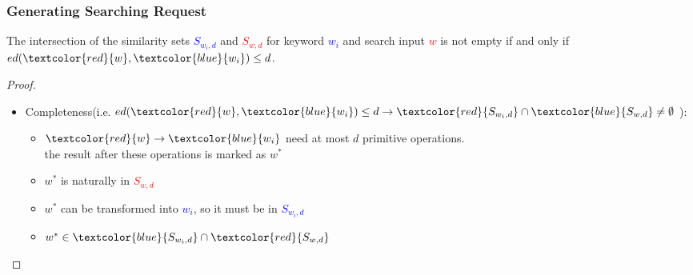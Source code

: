 \documentclass{beamer}
\begin{document}
\begin{frame}
	\frametitle{Generating Searching Request}
	\begin{theorem}
		The intersection of the similarity sets \textcolor{blue}{${S_{{w_i},d}}$} and \textcolor{red}{${S_{w,d}}$} for keyword \textcolor{blue}{$w_i$} and  search input \textcolor{red}{$w$} is not empty if and only if $ed(\textcolor{red}{w},\textcolor{blue}{w_i}) \le d$.
	\end{theorem}
	
	\begin{proof}
		\begin{itemize}
			\item Completeness(i.e. $ed(\textcolor{red}{w},\textcolor{blue}{w_i}) \le d \to \textcolor{red}{S_{{w_i},d}} \cap \textcolor{blue}{S_{w,d}} \ne \emptyset $ ):
			\begin{itemize}
				\item $\textcolor{red}{w} \to \textcolor{blue}{{w_i}}$ need at most $d$ primitive operations.\\the result after these operations is marked as $w^*$
				\item $w^*$ is naturally in \textcolor{red}{${S_{w,d}}$} 
				\item $w^*$ can be transformed into \textcolor{blue}{${w_i}$}, so it must be in \textcolor{blue}{${S_{{w_i},d}}$} 
				\item $w^* \in \textcolor{blue}{S_{{w_i},d}} \cap \textcolor{red}{S_{w,d}}$
			\end{itemize}
		\end{itemize}
	\end{proof}
\end{frame}
\end{document}
